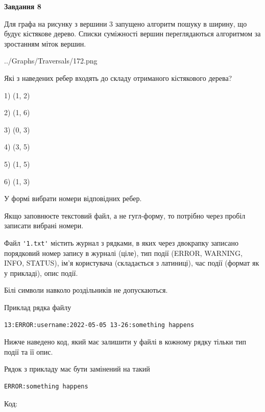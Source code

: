 \documentclass[12pt, ukrainian]{article}
\def\code#1{\Verb!#1!}
\begin{document}
{\begin {large}
{\begin {center}\textbf{Завдання 8}\end {center}}\par
Для графа на рисунку з вершини 3 запущено алгоритм пошуку в ширину, що будує кістякове дерево. Списки суміжності вершин переглядаються алгоритмом за зростанням міток вершин.\par
\begin{center}
	{../Graphs/Traversals/172.png}
\end{center}
\par Які з наведених ребер входять до складу отриманого кістякового дерева?\par
1) (1, 2)\par
2) (1, 6)\par
3) (0, 3)\par
4) (3, 5)\par
5) (1, 5)\par
6) (1, 3)\par
{\vskip 15pt} У формі вибрати номери відповідних ребер.


Якщо заповнюєте текстовий файл, а не гугл-форму, то потрібно через пробіл записа\-ти вибрані номери.\par
\newpage


Файл \code{'1.txt'} містить журнал з рядками, в яких через двокрапку записано поряд\-ко\-вий номер запису в журналі (ціле), тип події (ERROR, WARNING, INFO, STATUS), ім'я користувача (складається з латиниці), час події (фор\-мат як у прикладі), опис події.

Білі символи навколо роздільників не допускаються.

Приклад рядка файлу



\begin{verbatim}
13:ERROR:username:2022-05-05 13-26:something happens
\end{verbatim}


Нижче наведено код, який має залишити у файлі в кожному рядку тільки тип події та її опис.

Рядок з прикладу має бути замінений на такий



\begin{verbatim}
ERROR:something happens
\end{verbatim}




Код:




\end{large}}
\end{document}
